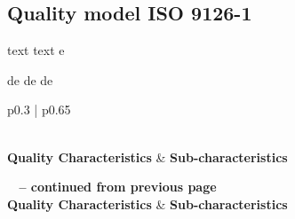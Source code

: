 \subsection{Quality model ISO 9126-1}
text text
e

de
de
de


\begin{longtable}{p{} | p{}}
    \caption{Sub-characteristics of the ISO 9126-1 quality model.} \label{tab:table1} \\
    \textbf{Quality Characteristics} & \textbf{Sub-characteristics} \\
    \hline
    \endfirsthead

    {{\bfseries \tablename\ \thetable{} -- continued from previous page}} \\
    \textbf{Quality Characteristics} & \textbf{Sub-characteristics} \\
    \hline
    \endhead

    \hline {} \\
    \endfoot


\end{longtable}
